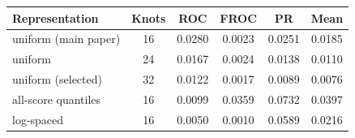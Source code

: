 \begin{tabular}{lccccc}
\toprule
Representation & Knots & ROC & FROC & PR & Mean \\
\midrule
uniform (main paper) & 16 & 0.0280 & 0.0023 & 0.0251 & 0.0185 \\
uniform & 24 & 0.0167 & 0.0024 & 0.0138 & 0.0110 \\
uniform (selected) & 32 & 0.0122 & 0.0017 & 0.0089 & 0.0076 \\
all-score quantiles & 16 & 0.0099 & 0.0359 & 0.0732 & 0.0397 \\
log-spaced & 16 & 0.0050 & 0.0010 & 0.0589 & 0.0216 \\
\bottomrule
\end{tabular}

